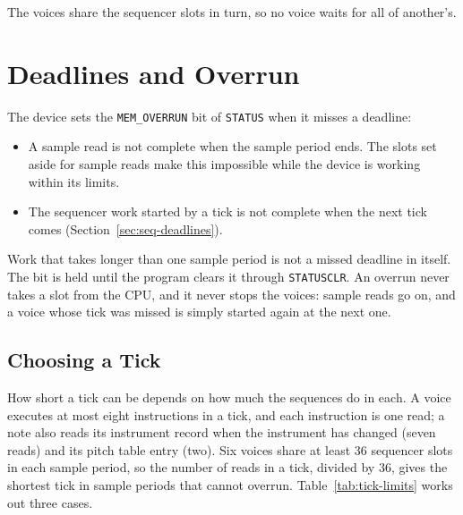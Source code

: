 The voices share the sequencer slots in turn, so no voice waits for all of another's.

\section{Deadlines and Overrun}
\label{sec:deadlines}

The device sets the \texttt{MEM\_OVERRUN} bit of \texttt{STATUS} when it misses a deadline:

\begin{itemize}
	\item A sample read is not complete when the sample period ends. The slots set aside for sample reads make this impossible
	      while the device is working within its limits.
	\item The sequencer work started by a tick is not complete when the next tick comes (Section~\ref{sec:seq-deadlines}).
\end{itemize}

Work that takes longer than one sample period is not a missed deadline in itself. The bit is held until the program
clears it through \texttt{STATUSCLR}. An overrun never takes a slot from the CPU, and it never stops the voices: sample
reads go on, and a voice whose tick was missed is simply started again at the next one.

\subsection{Choosing a Tick}
\label{sec:choosing-tick}

How short a tick can be depends on how much the sequences do in each. A voice executes at most eight instructions in a
tick, and each instruction is one read; a note also reads its instrument record when the instrument has changed (seven
reads) and its pitch table entry (two). Six voices share at least 36 sequencer slots in each sample period, so the
number of reads in a tick, divided by 36, gives the shortest tick in sample periods that cannot overrun.
Table~\ref{tab:tick-limits} works out three cases.

